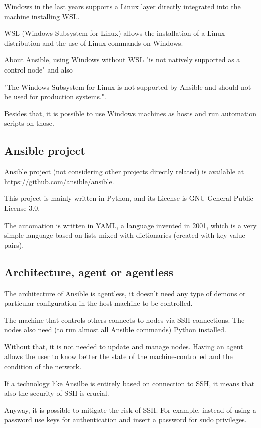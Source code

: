 \documentclass[12pt,a4paper,openright,twoside]{book}
\begin{document}
Windows in the last years supports a Linux layer directly integrated into the machine installing WSL.

WSL (Windows Subsystem for Linux) allows the installation of a Linux distribution and the use of Linux commands on Windows.


About Ansible, using Windows without WSL "is not natively supported as a control node"\cite{ansibleDocInstallIntro} and also


"The Windows Subsystem for Linux is not supported by Ansible and should not be used for production systems."\cite{ansibleWinFaq}.


Besides that, it is possible to use Windows machines as hosts and run automation scripts on those.

\subsection{Ansible project}

Ansible project (not considering other projects directly related) is available at \url{https://github.com/ansible/ansible}\cite{ansibleGithub}.


This project is mainly written in Python, and its License is GNU General Public License 3.0.


The automation is written in YAML, a language invented in 2001, which is a very simple language based on lists mixed with dictionaries (created with key-value pairs).

\subsection{Architecture, agent or agentless}


The architecture of Ansible is agentless, it doesn't need any type of demons or particular configuration in the host machine to be controlled.


The machine that controls others connects to nodes via SSH connections. The nodes also need (to run almost all Ansible commands) Python installed.


Without that, it is not needed to update and manage nodes. Having an agent allows the user to know better the state of the machine-controlled and the condition of the network.


If a technology like Ansilbe is entirely based on connection to SSH, it means that also the security of SSH is crucial.

Anyway, it is possible to mitigate the risk of SSH. For example, instead of using a password use keys for authentication and insert a password for sudo privileges\cite{ansibleSSH}.
\end{document}
